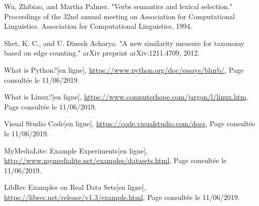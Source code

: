 \begin{thebibliography}{100}
 Wu, Zhibiao, and Martha Palmer. "Verbs semantics and lexical selection." Proceedings of the 32nd annual meeting on Association for Computational Linguistics. Association for Computational Linguistics, 1994.

 Shet, K. C., and U. Dinesh Acharya. "A new similarity measure for taxonomy based on edge counting." arXiv preprint arXiv:1211.4709, 2012.

 What is Python?[en ligne], \url{https://www.python.org/doc/essays/blurb/}, Page consultée le 11/06/2019.

 What is Linux?[en ligne], \url{https://www.computerhope.com/jargon/l/linux.htm}, Page consultée le 11/06/2019.


 Visual Studio Code[en ligne], \url{https://code.visualstudio.com/docs}, Page consultée le 11/06/2019.

 MyMediaLite: Example Experiments[en ligne], \url{http://www.mymedialite.net/examples/datasets.html}, Page consultée le 11/06/2019.

 LibRec Examples on Real Data Sets[en ligne], \url{https://librec.net/release/v1.3/example.html}, Page consultée le 11/06/2019.
\end{thebibliography}